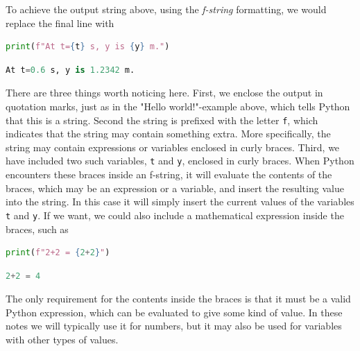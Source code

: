 \documentclass[graybox,envcountchap,sectrefs,final]{svmonodo}
\begin{document}
To achieve the output string above, using the \emph{f-string} formatting, we would replace the final line with
\begin{lstlisting}[language=Python,style=blue1]
print(f"At t={t} s, y is {y} m.")
\end{lstlisting}
\begin{lstlisting}[language=Python,style=gray]
At t=0.6 s, y is 1.2342 m.
\end{lstlisting}
There are three things worth noticing here. First, we enclose the output in quotation marks, just as in the
"Hello world!"-example above, which tells Python that this is a string. Second the string is prefixed with the letter \texttt{f},
which indicates that the string may contain something extra. More specifically, the string may contain
expressions or variables enclosed in curly braces. Third, we have included two such variables, \texttt{t} and \texttt{y}, enclosed in curly
braces. When Python encounters these braces inside an f-string, it will evaluate the contents of the braces, which may be an
expression or a variable, and insert the resulting value into the string. In this case it will simply insert the
current values of the variables \texttt{t} and \texttt{y}. If we want, we could also include a mathematical expression inside the
braces, such as
\begin{lstlisting}[language=Python,style=blue1]
print(f"2+2 = {2+2}")
\end{lstlisting}
\begin{lstlisting}[language=Python,style=gray]
2+2 = 4
\end{lstlisting}
The only requirement for the contents inside the braces is that it must be a valid Python expression, which can be
evaluated to give some kind of value. In these notes we will typically use it for numbers, but it may also be used
for variables with other types of values.
\end{document}
